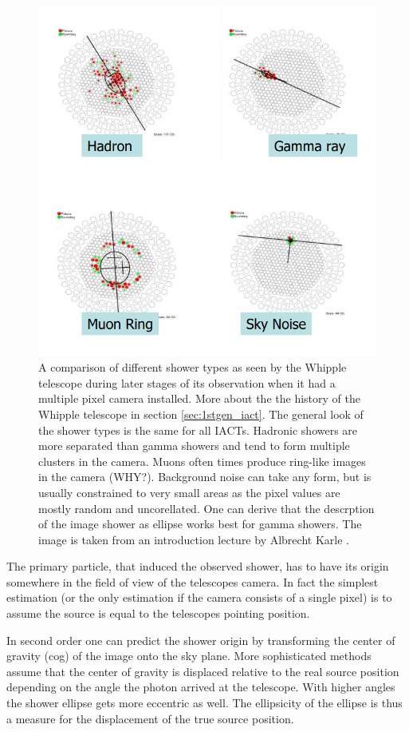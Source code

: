 \begin{figure}
	\centering
	\includegraphics[width=.5\textwidth]{images/shower_types.png}
	\caption{A comparison of different shower types as seen 
	by the Whipple telescope during later stages of its observation
	when it had a multiple pixel camera installed.
	More about the the history of the Whipple telescope in section
	\ref{sec:1stgen_iact}. The general look of the shower types 
	is the same for all IACTs.
	Hadronic showers are more separated than gamma showers and tend to
	form multiple clusters in the camera.
	Muons often times produce ring-like images in the camera (WHY?).
	Background noise can take any form, but is usually constrained to very small
	areas as the pixel values are mostly random and uncorellated.
	One can derive that the descrption of the image shower as ellipse
	works best for gamma showers.
	The image is taken from an introduction lecture by Albrecht Karle \cite{icecube_showers}.}
	\label{fig:compare_showers}
\end{figure}

The primary particle, that induced the observed shower, has to have its 
origin somewhere in the field of view of the telescopes camera.
In fact the simplest estimation (or the only estimation if the camera consists of a single pixel)
is to assume the source is equal to the telescopes pointing position.

In second order one can predict the shower origin by 
transforming the center of gravity (cog) of the image onto the sky plane.
More sophisticated methods assume that the 
center of gravity is displaced relative to the
real source position depending on the angle the photon arrived at the telescope.
With higher angles the shower ellipse gets more eccentric as well.
The ellipsicity of the ellipse is thus a measure for the displacement of the true 
source position.

